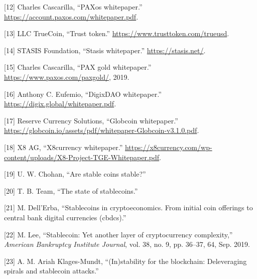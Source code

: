 \documentclass[english,]{IEEEtran}
\begin{document}
\leavevmode\hypertarget{ref-PAXos:whitepaper}{}%
{[}12{]} Charles Cascarilla, ``PAXos whitepaper.''
\url{https://account.paxos.com/whitepaper.pdf}.

\leavevmode\hypertarget{ref-TrueUSD:whitepaper}{}%
{[}13{]} LLC TrueCoin, ``Trust token.''
\url{https://www.trusttoken.com/trueusd}.

\leavevmode\hypertarget{ref-Stasis:whitepaper}{}%
{[}14{]} STASIS Foundation, ``Stasis whitepaper.''
\url{https://stasis.net/}.

\leavevmode\hypertarget{ref-PAXGold:whitepaper}{}%
{[}15{]} Charles Cascarilla, ``PAX gold whitepaper.''
\url{https://www.paxos.com/paxgold/}, 2019.

\leavevmode\hypertarget{ref-DigixDAO:whitepaper}{}%
{[}16{]} Anthony C. Eufemio, ``DigixDAO whitepaper.''
\url{https://digix.global/whitepaper.pdf}.

\leavevmode\hypertarget{ref-globcoin:whitepaper}{}%
{[}17{]} Reserve Currency Solutions, ``Globcoin whitepaper.''
\url{https://globcoin.io/assets/pdf/whitepaper-Globcoin-v3.1.0.pdf}.

\leavevmode\hypertarget{ref-x8currency:whitepaper}{}%
{[}18{]} X8 AG, ``X8currency whitepaper.''
\url{https://x8currency.com/wp-content/uploads/X8-Project-TGE-Whitepaper.pdf}.

\leavevmode\hypertarget{ref-Are_Stable_Coins_Stable}{}%
{[}19{]} U. W. Chohan, ``Are stable coins stable?''

\leavevmode\hypertarget{ref-THE_STATE_OF_STABLECOINS}{}%
{[}20{]} T. B. Team, ``The state of stablecoins.''

\leavevmode\hypertarget{ref-Stablecoins_in_Cryptoeconomics}{}%
{[}21{]} M. Dell'Erba, ``Stablecoins in cryptoeconomics. From initial
coin offerings to central bank digital currencies (cbdcs).''

\leavevmode\hypertarget{ref-Stablecoin:_Yet_Another_Layer_of_Cryptocurrency_Complexity}{}%
{[}22{]} M. Lee, ``Stablecoin: Yet another layer of cryptocurrency
complexity,'' \emph{American Bankruptcy Institute Journal}, vol. 38, no.
9, pp. 36--37, 64, Sep. 2019.

\leavevmode\hypertarget{ref-In_stability_for_the_Blockchain}{}%
{[}23{]} A. M. Ariah Klages-Mundt, ``(In)stability for the blockchain:
Deleveraging spirals and stablecoin attacks.''
\end{document}

